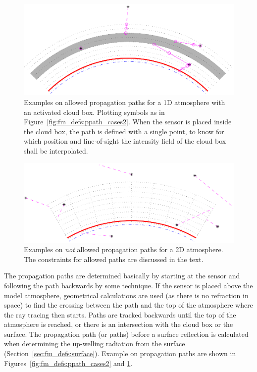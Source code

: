 \begin{figure}
 \begin{center}
  \includegraphics*[width=0.95\hsize]{ppath_cases1}
  \caption{Examples on allowed propagation paths for a 1D atmosphere
    with an activated cloud box. Plotting symbols as in
    Figure~\ref{fig:fm_defs:ppath_cases2}. When the sensor is placed 
    inside the cloud box, the path is defined with a single point, 
    to know for which position and line-of-sight the intensity field of
    the cloud box shall be interpolated. }
  \label{fig:fm_defs:ppath_cases1}
 \end{center}
\end{figure}

\begin{figure}
 \begin{center}
  \includegraphics*[width=0.95\hsize]{ppath_badcases}
  \caption{Examples on \emph{not} allowed propagation paths for a 2D 
    atmosphere. The constraints for allowed paths are discussed in the
    text.}
  \label{fig:fm_defs:ppath_badcases}
 \end{center}
\end{figure}


The propagation paths are determined basically by starting at the
sensor and following the path backwards by some  technique. If the sensor is placed above the model
atmosphere, geometrical calculations are used (as there is no
refraction in space) to find the crossing between the path and the top
of the atmosphere where the ray tracing then starts. Paths are tracked
backwards until the top of the atmosphere is reached, or there is an
intersection with the cloud box or the surface. The propagation path
(or paths) before a surface reflection is calculated when determining
the up-welling radiation from the surface
(Section~\ref{sec:fm_defs:surface}). Example on propagation
paths are shown in Figures~\ref{fig:fm_defs:ppath_cases2} and 
\ref{fig:fm_defs:ppath_cases1}.
 
